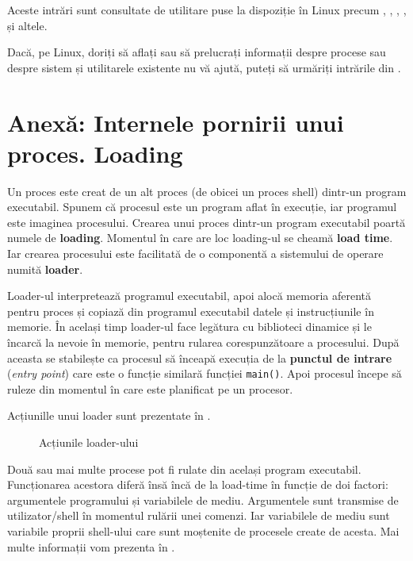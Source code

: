 Aceste intrări sunt consultate de utilitare puse la dispoziție în Linux precum
, , , ,  și altele.

\begin{note}
Dacă, pe Linux, doriți să aflați sau să prelucrați informații despre
procese sau despre sistem și utilitarele existente nu vă ajută, puteți să
  urmăriți intrările din .
\end{note}

\section{Anexă: Internele pornirii unui proces. Loading}
\label{sec:procese-loading}

Un proces este creat de un alt proces (de obicei un proces shell) dintr-un
program executabil. Spunem că procesul este un program aflat în execuție, iar
programul este imaginea procesului. Crearea unui proces dintr-un program
executabil poartă numele de \textbf{loading}. Momentul în care are loc loading-ul se
cheamă \textbf{load time}. Iar crearea procesului este facilitată de o componentă a
sistemului de operare numită \textbf{loader}.

Loader-ul interpretează programul executabil, apoi alocă memoria aferentă pentru
proces și copiază din programul executabil datele și instrucțiunile în memorie.
În același timp loader-ul face legătura cu biblioteci dinamice și le încarcă la
nevoie în memorie, pentru rularea corespunzătoare a procesului. După aceasta se
stabilește ca procesul să înceapă execuția de la \textbf{punctul de intrare} (\textit{entry
point}) care este o funcție similară funcției \texttt{main()}. Apoi procesul începe să ruleze din momentul în care este planificat pe
un procesor.

Acțiunille unui loader sunt prezentate în .

\begin{figure}[!htbp]
	\centering
	\def\svgwidth{0.8\textwidth}
	
	\caption{Acțiunile loader-ului}
	\label{fig:process-loader}
\end{figure}

Două sau mai multe procese pot fi rulate din același program executabil.
Funcționarea acestora diferă însă încă de la load-time în funcție de doi
factori: argumentele programului și variabilele de mediu. Argumentele sunt
transmise de utilizator/shell în momentul rulării unei comenzi. Iar variabilele
de mediu sunt variabile proprii shell-ului care sunt moștenite de procesele
create de acesta. Mai multe informații vom prezenta în .

